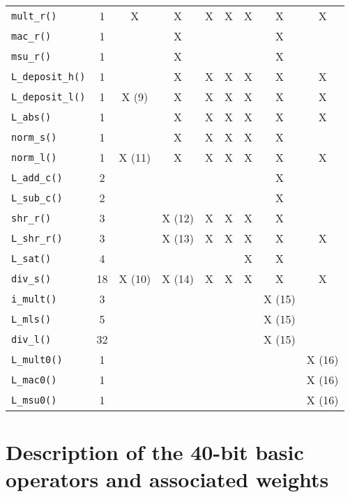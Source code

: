 \begin{table}[th]
\begin{center}
\begin{tabular}{|l|c|c|c|c|c|c|c|c|}
            {\tt mult\_r()} &1 &X &X &X &X &X &X &X\\
            {\tt mac\_r()}  &1 & &X & & & &X & \\
            {\tt msu\_r()}  &1 & &X & & & &X & \\
            {\tt L\_deposit\_h()}   &1 & &X &X &X &X &X &X\\
            {\tt L\_deposit\_l()}   &1 &X (9) &X &X &X &X &X &X\\
            {\tt L\_abs()}  &1 & &X &X &X &X &X &X\\
            {\tt norm\_s()}         &1 & &X &X &X &X &X & \\
            {\tt norm\_l()} &1 &X (11) &X &X &X &X &X &X\\
            {\tt L\_add\_c()}       &2 & & & & & &X & \\
            {\tt L\_sub\_c()}       &2 & & & & & &X & \\
            {\tt shr\_r()}  &3 & &X (12) &X &X &X &X & \\
            {\tt L\_shr\_r()}       &3 & &X (13) &X &X &X &X &X\\
            {\tt L\_sat()}  &4 & & & & &X &X &\\
            {\tt div\_s()}  &18 &X (10) &X (14) &X &X &X &X &X\\
            \hline
            {\tt i\_mult()} &3 & & & & & &X (15) & \\
            {\tt L\_mls()}  &5 & & & & & &X (15) & \\
            {\tt div\_l()}  &32 & & & & & &X (15) & \\
            \hline
            {\tt L\_mult0()} &1 & & & & & & &X (16)\\
            {\tt L\_mac0()}  &1 & & & & & & &X (16)\\
            {\tt L\_msu0()}  &1 & & & & & & &X (16)\\
            \hline
        \end{tabular}
    \end{center}
\end{table}

\flushfloats

\section{Description of the 40-bit basic operators and associated weights}

